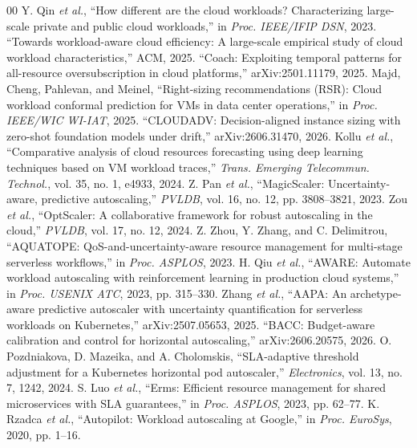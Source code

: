 \documentclass[conference]{IEEEtran}
\begin{document}
\begin{thebibliography}{00}
 Y. Qin \emph{et al.}, ``How different are the cloud workloads? Characterizing large-scale private and public cloud workloads,'' in \emph{Proc. IEEE/IFIP DSN}, 2023.
 ``Towards workload-aware cloud efficiency: A large-scale empirical study of cloud workload characteristics,'' ACM, 2025.
 ``Coach: Exploiting temporal patterns for all-resource oversubscription in cloud platforms,'' arXiv:2501.11179, 2025.
 Majd, Cheng, Pahlevan, and Meinel, ``Right-sizing recommendations (RSR): Cloud workload conformal prediction for VMs in data center operations,'' in \emph{Proc. IEEE/WIC WI-IAT}, 2025.
 ``CLOUDADV: Decision-aligned instance sizing with zero-shot foundation models under drift,'' arXiv:2606.31470, 2026.
 Kollu \emph{et al.}, ``Comparative analysis of cloud resources forecasting using deep learning techniques based on VM workload traces,'' \emph{Trans. Emerging Telecommun. Technol.}, vol. 35, no. 1, e4933, 2024.
 Z. Pan \emph{et al.}, ``MagicScaler: Uncertainty-aware, predictive autoscaling,'' \emph{PVLDB}, vol. 16, no. 12, pp. 3808--3821, 2023.
 Zou \emph{et al.}, ``OptScaler: A collaborative framework for robust autoscaling in the cloud,'' \emph{PVLDB}, vol. 17, no. 12, 2024.
 Z. Zhou, Y. Zhang, and C. Delimitrou, ``AQUATOPE: QoS-and-uncertainty-aware resource management for multi-stage serverless workflows,'' in \emph{Proc. ASPLOS}, 2023.
 H. Qiu \emph{et al.}, ``AWARE: Automate workload autoscaling with reinforcement learning in production cloud systems,'' in \emph{Proc. USENIX ATC}, 2023, pp. 315--330.
 Zhang \emph{et al.}, ``AAPA: An archetype-aware predictive autoscaler with uncertainty quantification for serverless workloads on Kubernetes,'' arXiv:2507.05653, 2025.
 ``BACC: Budget-aware calibration and control for horizontal autoscaling,'' arXiv:2606.20575, 2026.
 O. Pozdniakova, D. Mazeika, and A. Cholomskis, ``SLA-adaptive threshold adjustment for a Kubernetes horizontal pod autoscaler,'' \emph{Electronics}, vol. 13, no. 7, 1242, 2024.
 S. Luo \emph{et al.}, ``Erms: Efficient resource management for shared microservices with SLA guarantees,'' in \emph{Proc. ASPLOS}, 2023, pp. 62--77.
 K. Rzadca \emph{et al.}, ``Autopilot: Workload autoscaling at Google,'' in \emph{Proc. EuroSys}, 2020, pp. 1--16.

\end{thebibliography}
\end{document}
